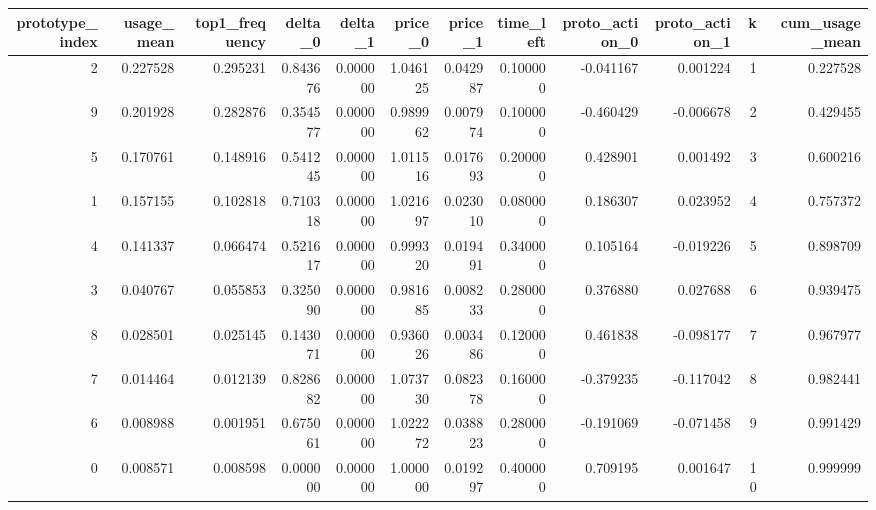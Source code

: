 \begin{tabular}{rrrrrrrrrrrr}
\toprule
prototype\_index & usage\_mean & top1\_frequency & delta\_0 & delta\_1 & price\_0 & price\_1 & time\_left & proto\_action\_0 & proto\_action\_1 & k & cum\_usage\_mean \\
\midrule
2 & 0.227528 & 0.295231 & 0.843676 & 0.000000 & 1.046125 & 0.042987 & 0.100000 & -0.041167 & 0.001224 & 1 & 0.227528 \\
9 & 0.201928 & 0.282876 & 0.354577 & 0.000000 & 0.989962 & 0.007974 & 0.100000 & -0.460429 & -0.006678 & 2 & 0.429455 \\
5 & 0.170761 & 0.148916 & 0.541245 & 0.000000 & 1.011516 & 0.017693 & 0.200000 & 0.428901 & 0.001492 & 3 & 0.600216 \\
1 & 0.157155 & 0.102818 & 0.710318 & 0.000000 & 1.021697 & 0.023010 & 0.080000 & 0.186307 & 0.023952 & 4 & 0.757372 \\
4 & 0.141337 & 0.066474 & 0.521617 & 0.000000 & 0.999320 & 0.019491 & 0.340000 & 0.105164 & -0.019226 & 5 & 0.898709 \\
3 & 0.040767 & 0.055853 & 0.325090 & 0.000000 & 0.981685 & 0.008233 & 0.280000 & 0.376880 & 0.027688 & 6 & 0.939475 \\
8 & 0.028501 & 0.025145 & 0.143071 & 0.000000 & 0.936026 & 0.003486 & 0.120000 & 0.461838 & -0.098177 & 7 & 0.967977 \\
7 & 0.014464 & 0.012139 & 0.828682 & 0.000000 & 1.073730 & 0.082378 & 0.160000 & -0.379235 & -0.117042 & 8 & 0.982441 \\
6 & 0.008988 & 0.001951 & 0.675061 & 0.000000 & 1.022272 & 0.038823 & 0.280000 & -0.191069 & -0.071458 & 9 & 0.991429 \\
0 & 0.008571 & 0.008598 & 0.000000 & 0.000000 & 1.000000 & 0.019297 & 0.400000 & 0.709195 & 0.001647 & 10 & 0.999999 \\
\bottomrule
\end{tabular}

